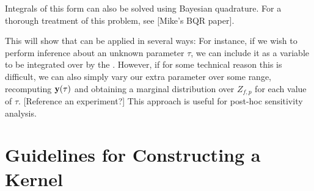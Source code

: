 %
%
%
%
%
%
%
%
%
Integrals of this form can also be solved using Bayesian quadrature.  For a thorough treatment of this problem, see [Mike's BQR paper].  

This will show that \bq{} can be applied in several ways:  For instance, if we wish to perform inference about an unknown parameter $\tau$, we can include it as a variable to be integrated over by the \gp{}.  However, if for some technical reason this is difficult, we can also simply vary our extra parameter over some range, recomputing ${\bf{y}}(\tau)$ and obtaining a marginal distribution over $Z_{f,p}$ for each value of $\tau$.  [Reference an experiment?]  This approach is useful for post-hoc sensitivity analysis.


\section{Guidelines for Constructing a Kernel}
\label{sec:kernels}

